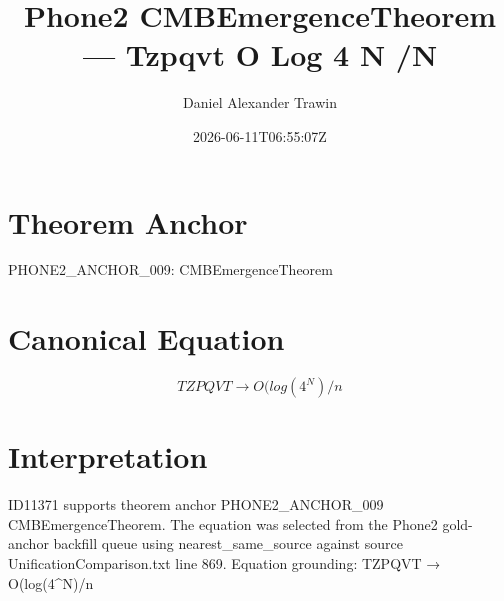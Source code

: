 \documentclass[11pt]{article}
\title{Phone2 CMBEmergenceTheorem — Tzpqvt O Log 4 N /N}
\author{Daniel Alexander Trawin}
\date{2026-06-11T06:55:07Z}
\begin{document}
\maketitle
\section*{Theorem Anchor}
PHONE2_ANCHOR_009: CMBEmergenceTheorem
\section*{Canonical Equation}
\[
TZPQVT → O(log(4^N)/n
\]
\section*{Interpretation}
ID11371 supports theorem anchor PHONE2_ANCHOR_009 CMBEmergenceTheorem. The equation was selected from the Phone2 gold-anchor backfill queue using nearest_same_source against source UnificationComparison.txt line 869. Equation grounding: TZPQVT → O(log(4^N)/n
\end{document}
